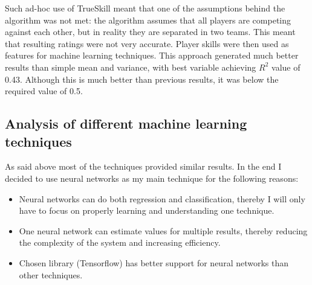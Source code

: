 \documentclass[12pt,a4paper]{book}
\begin{document}
Such ad-hoc use of TrueSkill meant that one of the assumptions behind the algorithm was not met:
the algorithm assumes that all players are competing against each other, but in reality they are separated in two teams.
This meant that resulting ratings were not very accurate.
Player skills were then used as features for machine learning techniques.
This approach generated much better results than simple mean and variance, with best variable achieving $R^2$ value of 0.43.
Although this is much better than previous results, it was below the required value of 0.5.

\subsection{Analysis of different machine learning techniques}
As said above most of the techniques provided similar results.
In the end I decided to use neural networks as my main technique for the following reasons:
\begin{itemize}
\item Neural networks can do both regression and classification, thereby I will only have to focus on properly learning and understanding one technique.
\item One neural network can estimate values for multiple results, thereby reducing the complexity of the system and increasing efficiency.
\item Chosen library (Tensorflow) has better support for neural networks than other techniques.
\end{itemize}
\end{document}
